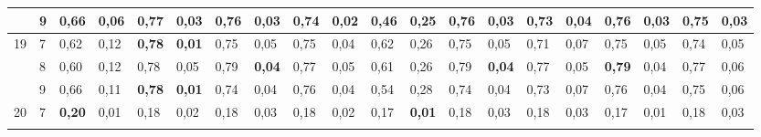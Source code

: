 \documentclass[conference]{IEEEtran}
\begin{document}
\begin{table}[]
\begin{tabular}{|cl|ll|ll|ll|ll|ll|ll|ll|ll|ll|}
		\multicolumn{1}{|c|}{}                    & 9 & \multicolumn{1}{l|}{0,66}          & 0,06          & \multicolumn{1}{l|}{\textbf{0,77}} & 0,03          & \multicolumn{1}{l|}{0,76}          & 0,03          & \multicolumn{1}{l|}{0,74} & \textbf{0,02} & \multicolumn{1}{l|}{0,46}                 & 0,25          & \multicolumn{1}{l|}{0,76}          & 0,03          & \multicolumn{1}{l|}{0,73}          & 0,04          & \multicolumn{1}{l|}{0,76}          & 0,03          & \multicolumn{1}{l|}{0,75}          & 0,03          \\ \hline
		\multicolumn{1}{|c|}{\multirow{3}{*}{19}} & 7 & \multicolumn{1}{l|}{0,62}          & 0,12          & \multicolumn{1}{l|}{\textbf{0,78}} & \textbf{0,01} & \multicolumn{1}{l|}{0,75}          & 0,05          & \multicolumn{1}{l|}{0,75} & 0,04          & \multicolumn{1}{l|}{0,62}                 & 0,26          & \multicolumn{1}{l|}{0,75}          & 0,05          & \multicolumn{1}{l|}{0,71}          & 0,07          & \multicolumn{1}{l|}{0,75}          & 0,05          & \multicolumn{1}{l|}{0,74}          & 0,05          \\ \cline{2-20} 
		\multicolumn{1}{|c|}{}                    & 8 & \multicolumn{1}{l|}{0,60}          & 0,12          & \multicolumn{1}{l|}{0,78}          & 0,05          & \multicolumn{1}{l|}{0,79}          & \textbf{0,04} & \multicolumn{1}{l|}{0,77} & 0,05          & \multicolumn{1}{l|}{0,61}                 & 0,26          & \multicolumn{1}{l|}{0,79}          & \textbf{0,04} & \multicolumn{1}{l|}{0,77}          & 0,05          & \multicolumn{1}{l|}{\textbf{0,79}} & 0,04          & \multicolumn{1}{l|}{0,77}          & 0,06          \\ \cline{2-20} 
		\multicolumn{1}{|c|}{}                    & 9 & \multicolumn{1}{l|}{0,66}          & 0,11          & \multicolumn{1}{l|}{\textbf{0,78}} & \textbf{0,01} & \multicolumn{1}{l|}{0,74}          & 0,04          & \multicolumn{1}{l|}{0,76} & 0,04          & \multicolumn{1}{l|}{0,54}                 & 0,28          & \multicolumn{1}{l|}{0,74}          & 0,04          & \multicolumn{1}{l|}{0,73}          & 0,07          & \multicolumn{1}{l|}{0,76}          & 0,04          & \multicolumn{1}{l|}{0,75}          & 0,06          \\ \hline
		\multicolumn{1}{|c|}{\multirow{3}{*}{20}} & 7 & \multicolumn{1}{l|}{\textbf{0,20}} & 0,01          & \multicolumn{1}{l|}{0,18}          & 0,02          & \multicolumn{1}{l|}{0,18}          & 0,03          & \multicolumn{1}{l|}{0,18} & 0,02          & \multicolumn{1}{l|}{0,17}                 & \textbf{0,01} & \multicolumn{1}{l|}{0,18}          & 0,03          & \multicolumn{1}{l|}{0,18}          & 0,03          & \multicolumn{1}{l|}{0,17}          & 0,01          & \multicolumn{1}{l|}{0,18}          & 0,03          \\ \cline{2-20} 

\end{tabular}
\end{table}
\end{document}
